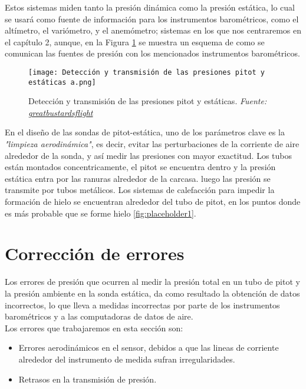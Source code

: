  Estos sistemas miden tanto la presión dinámica como la presión estática, lo cual se usará como fuente de información para los instrumentos barométricos, como el altímetro, el variómetro, y el anemómetro; sistemas en los que nos centraremos en el capítulo 2, aunque, en la Figura \ref{fig:esquemainstrumetosbarometricos} se muestra un esquema de como se comunican las fuentes de presión con los mencionados instrumentos barométricos.
\begin{figure}[H] 
    \centering
    \texttt{[image: Detección y transmisión de las presiones pitot y estáticas a.png]}
    \caption{\centering Detección y transmisión de las presiones pitot y estáticas. \textit{Fuente: \href{https://greatbustardsflight.blogspot.com/2017/09/analisis-de-indicaciones-erroneas-de.html}{greatbustardsflight}}}
    \label{fig:esquemainstrumetosbarometricos}
\end{figure}

En el diseño de las sondas de pitot-estática, uno de los parámetros clave es la \textit{"limpieza aerodinámica"}, es decir, evitar las perturbaciones de la corriente de aire alrededor de la sonda, y así medir las presiones con mayor exactitud. Los tubos están montados concentricamente, el pitot se encuentra dentro y la presión estática entra por las ranuras alrededor de la carcasa. luego las presión se transmite por tubos metálicos. Los sistemas de calefacción para impedir la formación de hielo se encuentran alrededor del tubo de pitot, en los puntos donde es más probable que se forme hielo \ref{fig:placeholder1}.\\

\section{Corrección de errores}
Los errores de presión que ocurren al medir la presión total en un tubo de pitot y la presión ambiente en  la sonda estática, da como resultado la obtención de datos incorrectos, lo que lleva a medidas incorrectas por parte de los instrumentos barométricos y a las computadoras de datos de aire.\\

Los errores que trabajaremos en esta sección son:

\begin{itemize}
\item Errores aerodinámicos en el sensor, debidos a que las lineas de corriente alrededor del instrumento de medida sufran irregularidades.
\item Retrasos en la transmisión de presión.
\end{itemize}

